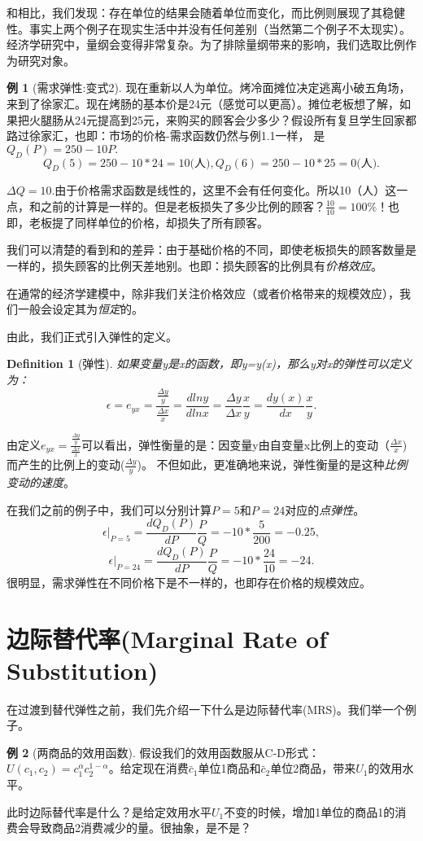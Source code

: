 \documentclass[UTF8]{ctexart}
\newtheorem{definition}{Definition}[section]
\theoremstyle{definition}
\newtheorem{example}{\kaishu 例}[section]
\begin{document}
和{}相比，我们发现：存在单位的结果会随着单位而变化，而比例则展现了其稳健性。事实上两个例子在现实生活中并没有任何差别（当然第二个例子不太现实）。经济学研究中，量纲会变得非常复杂。为了排除量纲带来的影响，我们选取比例作为研究对象。

\begin{example}[\kaishu 需求弹性:变式2]
\kaishu 现在重新以人为单位。烤冷面摊位决定逃离小破五角场，来到了徐家汇。现在烤肠的基本价是24元（感觉可以更高）。摊位老板想了解，如果把火腿肠从24元提高到25元，来购买的顾客会少多少？假设所有复旦学生回家都路过徐家汇，也即：市场的价格-需求函数仍然与例1.1一样， 是$Q_D(P)=250-10P.$
\[
Q_D(5)=250-10*24=10\text{(人)}, Q_D(6)=250-10*25=0\text{(人)}. 
\]
\end{example}
$\Delta Q=10.$由于价格需求函数是线性的，这里不会有任何变化。所以10（人）这一点，和之前{}的计算是一样的。但是老板损失了多少比例的顾客？$\frac{10}{10}=100\%$！也即，老板提了同样单位的价格，却损失了所有顾客。

我们可以清楚的看到{}和{}的差异：由于基础价格的不同，即使老板损失的顾客数量是一样的，损失顾客的比例天差地别。也即：损失顾客的比例具有\textit{价格效应}。 

在通常的经济学建模中，除非我们关注价格效应（或者价格带来的规模效应），我们一般会设定其为\textit{恒定}的。

由此，我们正式引入弹性的定义。


\begin{definition}[弹性]
如果变量y是x的函数，即y=y(x)，那么y对x的弹性可以定义为：
\[\epsilon=e_{yx}=\frac{\frac{\Delta y}{y}}{\frac{\Delta x}{x}}=\frac{d ln y}{d ln x}=\frac{\Delta y}{\Delta x} \frac{x}{y}=\frac{d y(x)}{dx}\frac{x}{y}.\]
\end{definition}
由定义$e_{yx}=\frac{\frac{\Delta y}{y}}{\frac{\Delta x}{x}}$可以看出，弹性衡量的是：因变量y由自变量x比例上的变动（$\frac{\Delta x}{x}$)而产生的比例上的变动($\frac{\Delta y}{y}$)。 不但如此，更准确地来说，弹性衡量的是这种\textit{比例变动的速度}。

在我们之前的例子中，我们可以分别计算$P=5$和$P=24$对应的\textit{点弹性}。
\[\epsilon|_{P=5}=\frac{d Q_D(P)}{dP}\frac{P}{Q}=-10*\frac{5}{200}=-0.25, \]
\[\epsilon|_{P=24}=\frac{d Q_D(P)}{dP}\frac{P}{Q}=-10*\frac{24}{10}=-24.\]
很明显，需求弹性在不同价格下是不一样的，也即存在价格的规模效应。

\section{边际替代率(Marginal Rate of Substitution)}
在过渡到替代弹性之前，我们先介绍一下什么是边际替代率(MRS)。我们举一个例子。
\begin{example}[两商品的效用函数]
假设我们的效用函数服从C-D形式：$U(c_1,c_2)=c_1^\alpha c_2^{1-\alpha}$。给定现在消费$\bar c_1$单位1商品和$\bar c_2$单位2商品，带来$U_1$的效用水平。
\end{example}
此时边际替代率是什么？是给定效用水平$U_1$不变的时候，增加1单位的商品1的消费会导致商品2消费减少的量。很抽象，是不是？
\end{document}
